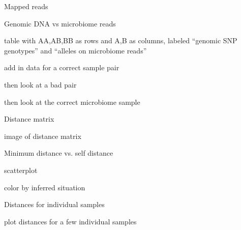 \documentclass[aspectratio=169,12pt,t]{beamer}
\begin{document}
\begin{frame}[c]{Mapped reads}



\note{}

\end{frame}


\begin{frame}[c]{Genomic DNA vs microbiome reads}

\bbi
 \item table with AA,AB,BB as rows and A,B as columns,
    labeled ``genomic SNP genotypes'' and ``alleles on microbiome reads''
 \item add in data for a correct sample pair
 \item then look at a bad pair
 \item then look at the correct microbiome sample
\ei

\note{}

\end{frame}



\begin{frame}[c]{Distance matrix}

\bbi
 \item image of distance matrix
\ei

\note{}

\end{frame}



\begin{frame}[c]{Minimum distance vs. self distance}

\bbi
 \item scatterplot
 \item color by inferred situation
\ei

\note{}

\end{frame}



\begin{frame}[c]{Distances for individual samples}

\bbi
 \item plot distances for a few individual samples
\ei

\note{}

\end{frame}
\end{document}
